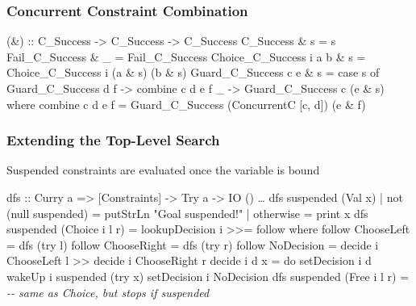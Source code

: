 \documentclass[
,hyperref={pdfpagelabels=false}
,xcolor=dvipsnames
]{beamer}
\newcommand{\comment}[1]{\textsl{-{}- #1}}
\begin{document}
\begin{frame}[fragile]%
\frametitle{Concurrent Constraint Combination}

\begin{haskell}
(\&) :: C_Success -> C_Success -> C_Success
C_Success              \& s = s
Fail_C_Success         \& _ = Fail_C_Success
Choice_C_Success i a b \& s = Choice_C_Success i (a \& s) (b \& s)
Guard_C_Success c e    \& s = case s of
  Guard_C_Success d f -> \alert{combine c d e f}
  _                   -> Guard_C_Success c (e \& s)
  where
  \alert{combine c d e f = Guard_C_Success (ConcurrentC [c, d]) (e \& f)}
\end{haskell}
\end{frame}

\begin{frame}[fragile]%
\frametitle{Extending the Top-Level Search}

Suspended constraints are evaluated once the variable is bound

\begin{haskell}
dfs :: Curry a => \alert{[Constraints] ->} Try a -> IO ()
\ldots
dfs suspended (Val x)
  \alert{| not (null suspended) = putStrLn "Goal suspended!"}
  | otherwise            = print x
dfs suspended (Choice i l r) = lookupDecision i >>= follow
  where
  follow ChooseLeft  = dfs (try l)
  follow ChooseRight = dfs (try r)
  follow NoDecision  = decide i ChooseLeft l >> decide i ChooseRight r \medskip
  decide i d x       = do setDecision i d
                          \alert{wakeUp i suspended (try x)}
                          setDecision i NoDecision
dfs suspended (Free   i l r) = \comment{same as Choice, but \alert{stops if suspended}}
\end{haskell}
\end{frame}
\end{document}
